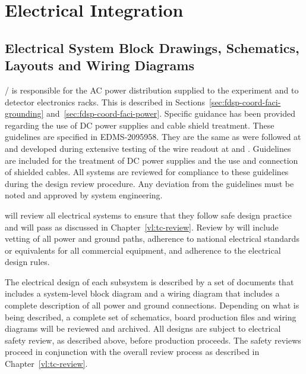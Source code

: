 

\section{Electrical Integration}
\label{sec:fdsp-Integ-electrical}


\subsection{Electrical System Block Drawings, Schematics, Layouts and Wiring Diagrams}
\label{sec:fdsp-coord-electrical}


/ is responsible for the AC power distribution supplied to
the experiment and to detector electronics racks.  This is described
in Sections~\ref{sec:fdsp-coord-faci-grounding}
and~\ref{sec:fdsp-coord-faci-power}.  Specific guidance has been
provided regarding the use of DC power supplies and cable shield
treatment.  These guidelines are specified in
EDMS-2095958\cite{bib:cernedms2095958}. They are the same as were
followed at  and developed during extensive testing
of the  wire readout at  and .
Guidelines are included for the treatment of DC power supplies and the
use and connection of shielded cables.  All systems are reviewed for
compliance to these guidelines during the design review procedure.
Any deviation from the guidelines must be noted and approved by system
engineering.

 will review all electrical systems to ensure that they
follow safe design practice and will pass  as discussed in
Chapter~\ref{vl:tc-review}.  Review by  will include vetting
of all power and ground paths, adherence to national electrical
standards or equivalents for all commercial equipment, and adherence
to the  electrical design rules.

The electrical design of each subsystem is described by a set of
documents that includes a system-level block diagram and a wiring
diagram that includes a complete description of all power and ground
connections.  Depending on what is being described, a complete set of
schematics, board production files and wiring diagrams will be
reviewed and archived.  All designs are subject to electrical safety
review, as described above, before production proceeds. The safety
reviews proceed in conjunction with the overall review process as
described in Chapter~\ref{vl:tc-review}.

